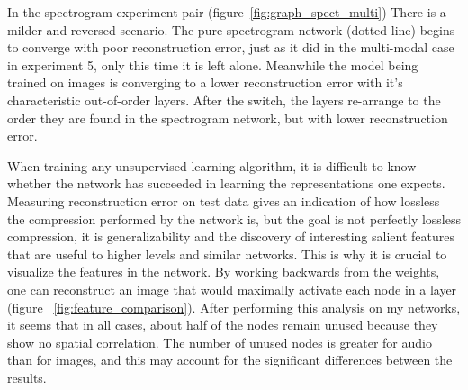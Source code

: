 \documentclass[12pt]{article}
\begin{document}
\begin{doublespacing}
	In the spectrogram experiment pair (figure~\ref{fig:graph_spect_multi}) There is a milder and reversed scenario. The pure-spectrogram network (dotted line) begins to converge with poor reconstruction error, just as it did in the multi-modal case in experiment 5, only this time it is left alone. Meanwhile the model being trained on images is converging to a lower reconstruction error with it's characteristic out-of-order layers. After the switch, the layers re-arrange to the order they are found in the spectrogram network, but with lower reconstruction error.
	
	When training any unsupervised learning algorithm, it is difficult to know whether the network has succeeded in learning the representations one expects. Measuring reconstruction error on test data gives an indication of how lossless the compression performed by the network is, but the goal is not perfectly lossless compression, it is generalizability and the discovery of interesting salient features that are useful to higher levels and similar networks. This is why it is crucial to visualize the features in the network. By working backwards from the weights, one can reconstruct an image that would maximally activate each node in a layer (figure ~\ref{fig:feature_comparison}). After performing this analysis on my networks, it seems that in all cases, about half of the nodes remain unused because they show no spatial correlation. The number of unused nodes is greater for audio than for images, and this may account for the significant differences between the results.


\end{doublespacing}
\end{document}

